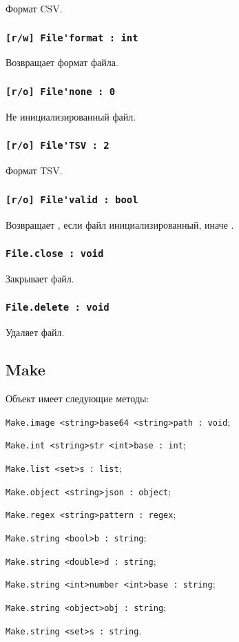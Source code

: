 Формат CSV.

\subsubsection{\lstinline|[r/w] File'format : int|}

Возвращает формат файла.

\subsubsection{\lstinline|[r/o] File'none : 0|}

Не инициализированный файл.

\subsubsection{\lstinline|[r/o] File'TSV : 2|}

Формат TSV.

\subsubsection{\lstinline|[r/o] File'valid : bool|}

Возвращает \true, если файл инициализированный, иначе \false.

\subsubsection{\lstinline|File.close : void|}

Закрывает файл.

\subsubsection{\lstinline|File.delete : void|}

Удаляет файл.

\subsection{{\color{orange} Make}}

Объект \make{} имеет следующие методы:
\begin{icItems}
	\item \lstinline|Make.image <string>base64 <string>path : void|;
	\item \lstinline|Make.int <string>str <int>base : int|;
	\item \lstinline|Make.list <set>s : list|;
	\item \lstinline|Make.object <string>json : object|;
	\item \lstinline|Make.regex <string>pattern : regex|;
	\item \lstinline|Make.string <bool>b : string|;
	\item \lstinline|Make.string <double>d : string|;
	\item \lstinline|Make.string <int>number <int>base : string|;
	\item \lstinline|Make.string <object>obj : string|;
	\item \lstinline|Make.string <set>s : string|.
\end{icItems}

